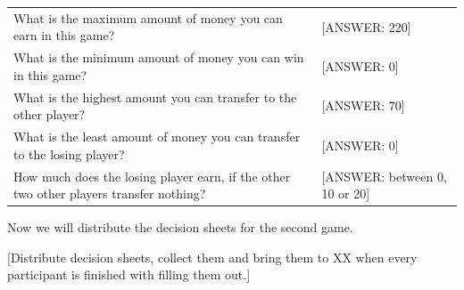 \documentclass[11pt,a4paper]{article}
\begin{document}
\begin{center}
\begin{tabular}{p{11cm}p{4cm}}
\toprule
What is the maximum amount of money you can earn in this game? & [ANSWER: 220] \\
What is the minimum amount of money you can win in this game? & [ANSWER: 0] \\
What is the highest amount you can transfer to the other player? & [ANSWER: 70] \\
What is the least amount of money you can transfer to the losing player? & [ANSWER: 0] \\
How much does the losing player earn, if the other two other players transfer nothing? & [ANSWER: between 0, 10 or 20] \\
\bottomrule
\end{tabular}
\end{center}

Now we will distribute the decision sheets for the second game.

\begin{center}[Distribute decision sheets, collect them and bring them to XX when every participant is finished with filling them out.]\end{center}
\end{document}

